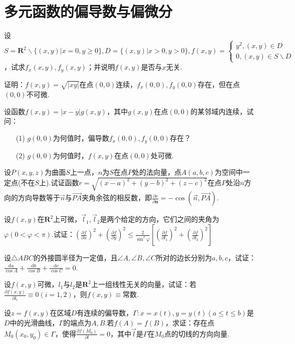 \section{多元函数的偏导数与偏微分}
\begin{xiti}
	\item 设$S=\mathbf{R}^{2} \backslash\{(x, y) | x=0, y \geqslant 0\},  D=\{(x, y) | x>0, y>0\},  f(x, y)=\left\{\begin{array}{l}{y^{2},(x, y) \in D} \\ {0,(x, y) \in S \backslash D}\end{array}\right.$，试求$f_{x}(x, y),  f_{y}(x, y)$；并说明$f(x,y)$是否与$x$无关.
	\item 证明：$f(x, y)=\sqrt{|x y|}$在点$(0,0)$连续，$f_{x}(0,0), f_{y}(0,0)$存在，但在点$(0,0)$不可微.
	\item 设函数$f(x, y)=|x-y| g(x, y)$，其中$g(x,y)$在点$(0,0)$的某邻域内连续，试问：
	\begin{enumerate}
		\item [(1)] $g(0,0)$为何值时，偏导数$f_{x}(0,0), f_{y}(0,0)$存在？
		\item [(2)]$g(0,0)$为何值时，$f(x,y)$在点$(0,0)$处可微.

	\end{enumerate}
	\item 设$P(x,y,z)$为曲面$S$上一点，$n$为$S$在点$P$处的法向量，点$A(a,b,c)$为空间中一定点(不在$S$上).试证函数$r=\sqrt{(x-a)^{2}+(y-b)^{2}+(z-c)^{2}}$在点$P$处沿$n$方向的方向导数等于$\vec{n}$与$\vec{PA}$夹角余弦的相反数，即$\frac{\partial r}{\partial \boldsymbol{n}}=-\cos (\vec{n}, \overrightarrow{P A})$.
	\item 设$f(x,y)$在$\mathbf{R}^{2}$上可微，$\vec{l}_{1}, \vec{l}_{2}$是两个给定的方向，它们之间的夹角为$\varphi(0<\varphi<\pi)$.试证：$\left(\frac{\partial f}{\partial x}\right)^{2}+\left(\frac{\partial f}{\partial y}\right)^{2} \leqslant \frac{2}{\sin ^{2} \varphi}\left[\left(\frac{\partial f}{\partial l_{1}}\right)^{2}+\left(\frac{\partial f}{\partial l_{2}}\right)^{2}\right]$
	\item 设$\triangle ABC$的外接圆半径为一定值，且$\angle A,\angle B,\angle C$所对的边长分别为$a,b,c$，试证：
	$\frac{\mathrm{d}a}{\cos A}+\frac{\mathrm{d}b}{\cos B}+\frac{\mathrm{d} c}{\cos C}=0$.
	\item 设$f(x,y)$可微，$l_{1}$与$l_{2}$是$\mathbf{R}^{2}$上一组线性无关的向量，试证：若$\frac{\partial f(x, y)}{\partial l_{i}} \equiv 0(i=1,2)$，则$f(x, y) \equiv\text{常数}$.
	
	\item 设$z=f(x,y)$在区域$D$有连续的偏导数，$\Gamma : x=x(t), y=y(t)(a \leqslant t \leqslant b)$是$D$中的光滑曲线，$\Gamma$的端点为$A,B$.若$f(A)=f(B)$，求证：存在点$M_{0}\left(x_{0}, y_{0}\right) \in \Gamma$，使得$\frac{\partial f\left(M_{0}\right)}{\partial l}=0$，其中$\vec{l}$是$\Gamma$在$M_{0}$点的切线的方向向量.
	

\end{xiti}
